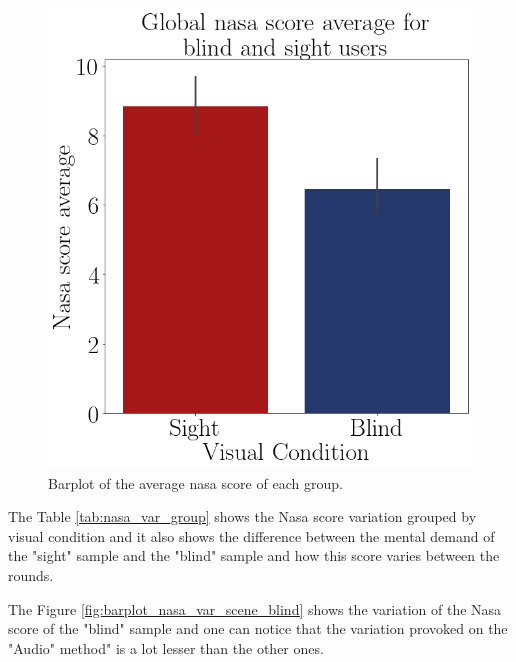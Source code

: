 \begin{figure}[!htb]
\begin{minipage}{.45\linewidth}
        \vspace{1.8cm}
        \includegraphics[width = \linewidth]{Resultados/Nasa/Figuras/png/barplot_nasa_avg_global.png}
        \caption{Barplot of the average nasa score of each group.}
        \label{fig:barplot_nasa_global}
    \end{minipage}
\end{figure}

The Table \ref{tab:nasa_var_group} shows the Nasa score variation grouped by visual condition and it also shows the difference between the mental demand of the "sight" sample and the "blind" sample and how this score varies between the rounds.





The Figure \ref{fig:barplot_nasa_var_scene_blind} shows the variation of the Nasa score of the "blind" sample and one can notice that the variation provoked on the "Audio" method" is a lot lesser than the other ones.

